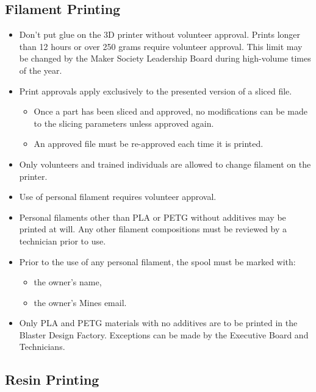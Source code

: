 \documentclass[12pt,letterpaper]{article}
\begin{document}
\subsection{Filament Printing}

\begin{itemize}
    \item Don’t put glue on the 3D printer without volunteer approval. 
    Prints longer than 12 hours or over 250 grams require volunteer approval. This limit may be changed by the Maker Society Leadership Board during high-volume times of the year.
    \item Print approvals apply exclusively to the presented version of a sliced file.
    \begin{itemize}
        \item Once a part has been sliced and approved, 
        no modifications can be made to the slicing parameters unless approved again.
        \item An approved file must be re-approved each time it is printed.
    \end{itemize}
    \item Only volunteers and trained individuals are allowed to change filament on the printer. 
    \item Use of personal filament requires volunteer approval.
    \item Personal filaments other than PLA or PETG without additives may be printed at will. Any other filament compositions must be reviewed by a technician prior to use.
    \item Prior to the use of any personal filament,
    the spool must be marked with: 
    \begin{itemize}
        \item the owner's name,
        \item the owner's Mines email.
    \end{itemize}
    \item Only PLA and PETG materials with no additives are to be printed in the Blaster Design Factory. Exceptions can be made by the Executive Board and Technicians.
\end{itemize}

\subsection{Resin Printing}
\end{document}
